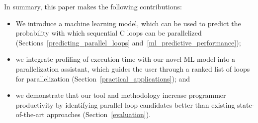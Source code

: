 In summary, this paper makes the following contributions:
%
\begin{itemize}
\renewcommand\labelitemi{$\vartriangleright$}
\renewcommand\labelitemii{$\bullet$}
\item We introduce a machine learning model, which can be used to predict the probability with which sequential C loops can be parallelized (Sections~\ref{predicting_parallel_loops} and~\ref{ml_predictive_performance});
\item we integrate profiling of execution time with our novel ML model into a parallelization assistant, which guides the user through a ranked list of loops for parallelization (Section~\ref{practical_applications}); and
\item we demonstrate that our tool and methodology increase programmer productivity by identifying parallel loop candidates better than existing state-of-the-art approaches (Section~\ref{evaluation}).

%
\end{itemize}
